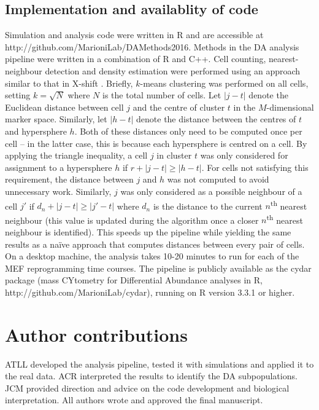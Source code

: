 \documentclass{article}
\begin{document}
\subsection{Implementation and availablity of code}
Simulation and analysis code were written in R and are accessible at {http://\-github.com/\-MarioniLab/\-DAMethods2016}.
Methods in the DA analysis pipeline were written in a combination of R and C++.
Cell counting, nearest-neighbour detection and density estimation were performed using an approach similar to that in X-shift \cite{samusik2016automated}.
Briefly, $k$-means clustering was performed on all cells, setting $k=\sqrt{N}$ where $N$ is the total number of cells.
Let $|j-t|$ denote the Euclidean distance between cell $j$ and the centre of cluster $t$ in the $M$-dimensional marker space.
Similarly, let $|h-t|$ denote the distance between the centres of $t$ and hypersphere $h$. 
Both of these distances only need to be computed once per cell -- in the latter case, this is because each hypersphere is centred on a cell.
By applying the triangle inequality, a cell $j$ in cluster $t$ was only considered for assignment to a hypersphere $h$ if $r + |j-t| \ge |h-t|$.
For cells not satisfying this requirement, the distance between $j$ and $h$ was not computed to avoid unnecessary work.
Similarly, $j$ was only considered as a possible neighbour of a cell $j'$ if $d_n + |j-t| \ge |j'-t|$ where $d_n$ is the distance to the current $n$\textsuperscript{th} nearest neighbour (this value is updated during the algorithm once a closer $n$\textsuperscript{th} nearest neighbour is identified).
This speeds up the pipeline while yielding the same results as a na\"ive approach that computes distances between every pair of cells.
On a desktop machine, the analysis takes 10-20 minutes to run for each of the MEF reprogramming time courses.
The pipeline is publicly available as the cydar package (mass CYtometry for Differential Abundance analyses in R, http://\-github.com/\-MarioniLab/\-cydar), running on R version 3.3.1 or higher.

\section{Author contributions}
ATLL developed the analysis pipeline, tested it with simulations and applied it to the real data. 
ACR interpreted the results to identify the DA subpopulations.
JCM provided direction and advice on the code development and biological interpretation.
All authors wrote and approved the final manuscript.
\end{document}
